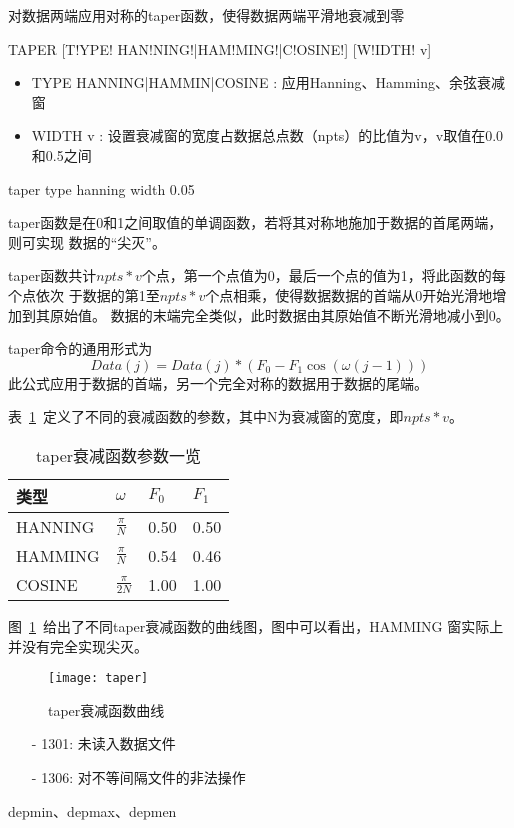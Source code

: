 \label{cmd:taper}

对数据两端应用对称的taper函数，使得数据两端平滑地衰减到零

\begin{SACSTX}
TAPER [T!YPE! HAN!NING!|HAM!MING!|C!OSINE!] [W!IDTH! v]
\end{SACSTX}

\begin{itemize}
\item TYPE HANNING|HAMMIN|COSINE : 应用Hanning、Hamming、余弦衰减窗
\item WIDTH v : 设置衰减窗的宽度占数据总点数（npts）的比值为v，v取值在0.0和0.5之间
\end{itemize}

\begin{SACDFT}
taper type hanning width 0.05
\end{SACDFT}

taper函数是在0和1之间取值的单调函数，若将其对称地施加于数据的首尾两端，则可实现
数据的``尖灭''。

taper函数共计$npts*v$个点，第一个点值为0，最后一个点的值为1，将此函数的每个点依次
于数据的第1至$npts*v$个点相乘，使得数据数据的首端从0开始光滑地增加到其原始值。
数据的末端完全类似，此时数据由其原始值不断光滑地减小到0。

taper命令的通用形式为
\[
    Data(j) = Data(j)*(F_0 - F_1\cos(\omega(j-1)))
\]
此公式应用于数据的首端，另一个完全对称的数据用于数据的尾端。

表~\ref{table:taper-functions}~定义了不同的衰减函数的参数，其中N为衰减窗的宽度，即$npts*v$。
\begin{table}[ht]
\centering
\caption{taper衰减函数参数一览}
\label{table:taper-functions}
\begin{tabular}{llll}
\toprule
类型 & $\omega$ & $F_0$	& $F_1$	\\
\midrule
HANNING	&	$\frac{\pi}{N}$	&	0.50	&	0.50	\\
HAMMING	&	$\frac{\pi}{N}$	&	0.54	&	0.46	\\
COSINE	&	$\frac{\pi}{2N}$	&	1.00	&	1.00	\\
\bottomrule
\end{tabular}
\end{table}

图~\ref{fig:taper-functions}~给出了不同taper衰减函数的曲线图，图中可以看出，HAMMING
窗实际上并没有完全实现尖灭。
\begin{figure}[!ht]
\centering
\texttt{[image: taper]}
\caption{taper衰减函数曲线}
\label{fig:taper-functions}
\end{figure}

\begin{itemize}
\item[-]1301: 未读入数据文件
\item[-]1306: 对不等间隔文件的非法操作
\end{itemize}

depmin、depmax、depmen
